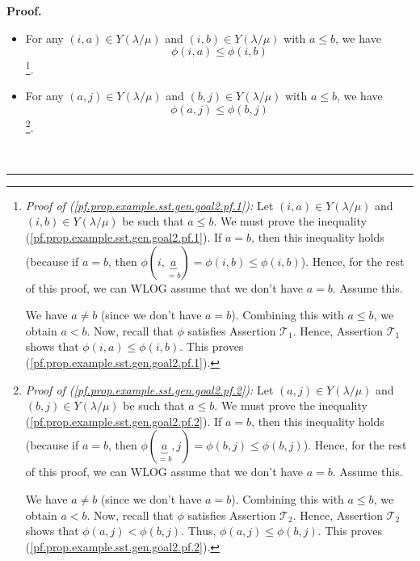 \documentclass[numbers=enddot,12pt,final,onecolumn,notitlepage,abstracton]{scrartcl}
\theoremstyle{definition}
\newenvironment{proof}[1][Proof]{\noindent\textbf{#1.} }{\ \rule{0.5em}{0.5em}}
\newenvironment{verlong}{}{}
\begin{document}
\begin{verlong}
\begin{footnotesize}
\begin{proof}
\begin{itemize}
\item For any $\left(  i,a\right)  \in Y\left(  \lambda/\mu\right)  $ and
$\left(  i,b\right)  \in Y\left(  \lambda/\mu\right)  $ with $a\leq b$, we
have
\begin{equation}
\phi\left(  i,a\right)  \leq\phi\left(  i,b\right)
\label{pf.prop.example.sst.gen.goal2.pf.1}%
\end{equation}
\footnote{\textit{Proof of (\ref{pf.prop.example.sst.gen.goal2.pf.1}):} Let
$\left(  i,a\right)  \in Y\left(  \lambda/\mu\right)  $ and $\left(
i,b\right)  \in Y\left(  \lambda/\mu\right)  $ be such that $a\leq b$. We must
prove the inequality (\ref{pf.prop.example.sst.gen.goal2.pf.1}). If $a=b$,
then this inequality holds (because if $a=b$, then $\phi\left(
i,\underbrace{a}_{=b}\right)  =\phi\left(  i,b\right)  \leq\phi\left(
i,b\right)  $). Hence, for the rest of this proof, we can WLOG assume that we
don't have $a=b$. Assume this.
\par
We have $a\neq b$ (since we don't have $a=b$). Combining this with $a\leq b$,
we obtain $a<b$. Now, recall that $\phi$ satisfies Assertion $\mathcal{T}_{1}%
$. Hence, Assertion $\mathcal{T}_{1}$ shows that $\phi\left(  i,a\right)
\leq\phi\left(  i,b\right)  $. This proves
(\ref{pf.prop.example.sst.gen.goal2.pf.1}).}.

\item For any $\left(  a,j\right)  \in Y\left(  \lambda/\mu\right)  $ and
$\left(  b,j\right)  \in Y\left(  \lambda/\mu\right)  $ with $a\leq b$, we
have%
\begin{equation}
\phi\left(  a,j\right)  \leq\phi\left(  b,j\right)
\label{pf.prop.example.sst.gen.goal2.pf.2}%
\end{equation}
\footnote{\textit{Proof of (\ref{pf.prop.example.sst.gen.goal2.pf.2}):} Let
$\left(  a,j\right)  \in Y\left(  \lambda/\mu\right)  $ and $\left(
b,j\right)  \in Y\left(  \lambda/\mu\right)  $ be such that $a\leq b$. We must
prove the inequality (\ref{pf.prop.example.sst.gen.goal2.pf.2}). If $a=b$,
then this inequality holds (because if $a=b$, then $\phi\left(  \underbrace{a}%
_{=b},j\right)  =\phi\left(  b,j\right)  \leq\phi\left(  b,j\right)  $).
Hence, for the rest of this proof, we can WLOG assume that we don't have
$a=b$. Assume this.
\par
We have $a\neq b$ (since we don't have $a=b$). Combining this with $a\leq b$,
we obtain $a<b$. Now, recall that $\phi$ satisfies Assertion $\mathcal{T}_{2}%
$. Hence, Assertion $\mathcal{T}_{2}$ shows that $\phi\left(  a,j\right)
<\phi\left(  b,j\right)  $. Thus, $\phi\left(  a,j\right)  \leq\phi\left(
b,j\right)  $. This proves (\ref{pf.prop.example.sst.gen.goal2.pf.2}).}.
\end{itemize}


\end{proof}
\end{footnotesize}
\end{verlong}
\end{document}
